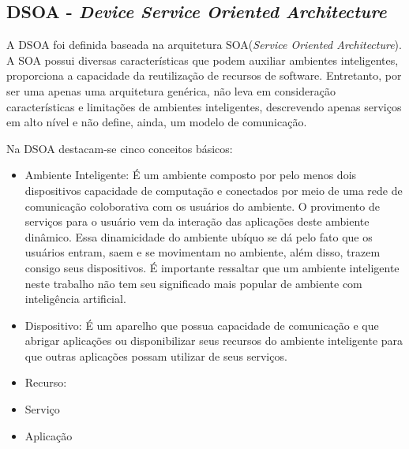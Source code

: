 \subsection{DSOA - \emph{Device Service Oriented Architecture}}

A DSOA foi definida baseada na arquitetura SOA(\emph{Service Oriented Architecture}). A SOA possui diversas características que podem auxiliar ambientes inteligentes, proporciona a capacidade da reutilização de recursos de software. Entretanto, por ser uma apenas uma arquitetura genérica, não leva em consideração características e limitações de ambientes inteligentes, descrevendo apenas serviços em alto nível e não define, ainda, um modelo de comunicação.

Na DSOA destacam-se cinco conceitos básicos:

\begin{itemize}
	\item Ambiente Inteligente:
		É um ambiente composto por pelo menos dois dispositivos capacidade de computação e conectados por meio de uma rede de comunicação coloborativa com os usuários do ambiente. O provimento de serviços para o usuário vem da interação das aplicações deste ambiente dinâmico. Essa dinamicidade do ambiente ubíquo se dá pelo fato que os usuários entram, saem e se movimentam no ambiente, além disso, trazem consigo seus dispositivos. É importante ressaltar que um ambiente inteligente neste trabalho não tem seu significado mais popular de ambiente com inteligência artificial.
	\item Dispositivo:
		É um aparelho que possua capacidade de comunicação e que abrigar aplicações ou disponibilizar seus recursos do ambiente inteligente para que outras aplicações possam utilizar de seus serviços.
	\item Recurso:
		
	\item Serviço
	\item Aplicação
\end{itemize}
